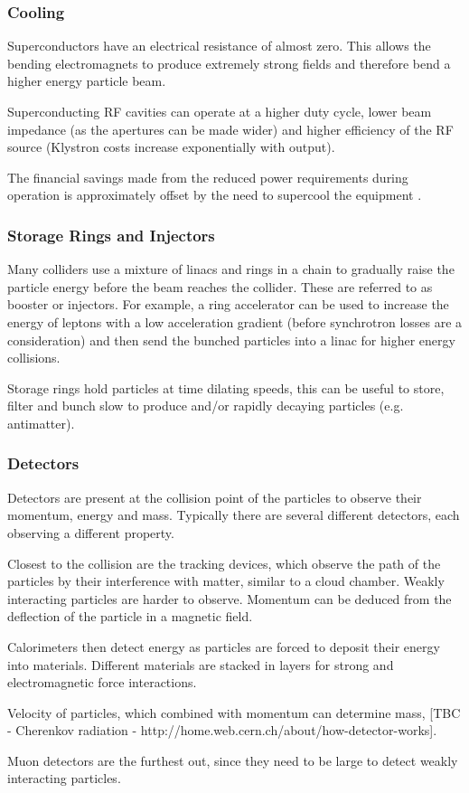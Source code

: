  
 \subsubsection{Cooling}
 
 Superconductors have an electrical resistance of almost zero. This allows the bending electromagnets to produce extremely strong fields and therefore bend a higher energy particle beam.
 
 Superconducting RF cavities can operate at a higher duty cycle, lower beam impedance (as the apertures can be made wider) and higher efficiency of the RF source (Klystron costs increase exponentially with output). 
 
 The financial savings made from the reduced power requirements during operation is approximately offset by the need to supercool the equipment \cite{?}.
 
 \subsubsection{Storage Rings and Injectors}
 
Many colliders use a mixture of linacs and rings in a chain to gradually raise the particle energy before the beam reaches the collider. These are referred to as booster or injectors. For example, a ring accelerator can be used to increase the energy of leptons with a low acceleration gradient (before synchrotron losses are a consideration) and then send the bunched particles into a linac for higher energy collisions.

Storage rings hold particles at time dilating speeds, this can be useful to store, filter and bunch slow to produce and/or rapidly decaying particles (e.g. antimatter).

 \subsubsection{Detectors}
  
 Detectors are present at the collision point of the particles to observe their momentum, energy and mass. Typically there are several different detectors, each observing a different property. 
 
 Closest to the collision are the tracking devices, which observe the path of the particles by their interference with matter, similar to a cloud chamber. Weakly interacting particles are harder to observe. Momentum can be deduced from the deflection of the particle in a magnetic field. 
 
 Calorimeters then detect energy as particles are forced to deposit their energy into materials. Different materials are stacked in layers for strong and electromagnetic force interactions. 
 
 Velocity of particles, which combined with momentum can determine mass, [TBC - Cherenkov radiation - http://home.web.cern.ch/about/how-detector-works].
 
 Muon detectors are the furthest out, since they need to be large to detect weakly interacting particles.
